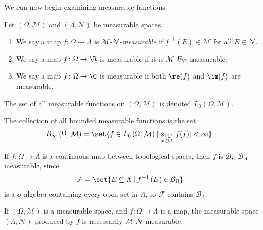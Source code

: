We can now begin examining measurable functions.
\begin{definition}
  Let $\left(\Omega,\mathcal{M}\right)$ and $\left(\Lambda,\mathcal{N}\right)$ be measurable spaces.
  \begin{enumerate}[(1)]
    \item We say a map $f\colon \Omega\rightarrow \Lambda$ is \textit{$\mathcal{M}$-$\mathcal{N}$-measurable} if $f^{-1}\left(E\right)\in \mathcal{M}$ for all $E\in \mathcal{N}$.
    \item We say a map $f\colon \Omega\rightarrow \R$ is measurable if it is $\mathcal{M}$-$\mathcal{B}_{\R}$-measurable.
    \item We say a map $f\colon \Omega\rightarrow \C$ is measurable if both $\re(f)$ and $\im(f)$ are measurable.
  \end{enumerate}
  The set of all measurable functions on $\left(\Omega,\mathcal{M}\right)$ is denoted $L_{0}\left(\Omega,\mathcal{M}\right)$.\newline

  The collection of all bounded measurable functions is the set
  \begin{align*}
    B_{\infty}\left(\Omega,\mathcal{M}\right) &= \set{f\in L_0\left(\Omega,\mathcal{M}\right)\mid \sup_{x\in\Omega}\left\vert f(x) \right\vert < \infty}.
  \end{align*}
\end{definition}
\begin{example}
  If $f\colon \Omega\rightarrow \Lambda$ is a continuous map between topological spaces, then $f$ is $\mathcal{B}_{\Omega}$-$\mathcal{B}_{\Lambda}$-measurable, since
  \begin{align*}
    \mathcal{F} &= \set{E\subseteq \Lambda\mid f^{-1}\left(E\right)\in \mathcal{B}_{\Omega}}
  \end{align*}
  is a $\sigma$-algebra containing every open set in $\Lambda$, so $\mathcal{F}$ contains $\mathcal{B}_{\Lambda}$.
\end{example}
\begin{example}
  If $\left(\Omega,\mathcal{M}\right)$ is a measurable space, and $f\colon \Omega\rightarrow \Lambda$ is a map, the measurable space $\left(\Lambda,\mathcal{N}\right)$ produced by $f$ is necessarily $\mathcal{M}$-$\mathcal{N}$-measurable.
\end{example}

